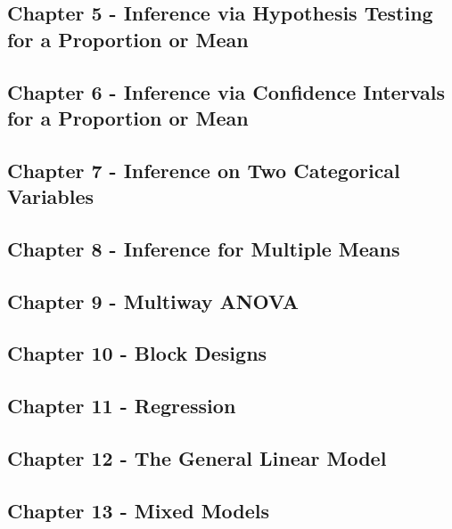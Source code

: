 \documentclass[]{book}
\theoremstyle{definition}
\theoremstyle{definition}
\theoremstyle{definition}
\theoremstyle{remark}
\begin{document}
\subsection{Chapter 5 - Inference via Hypothesis Testing for a
Proportion or
Mean}\label{chapter-5---inference-via-hypothesis-testing-for-a-proportion-or-mean}

\subsection{Chapter 6 - Inference via Confidence Intervals for a
Proportion or
Mean}\label{chapter-6---inference-via-confidence-intervals-for-a-proportion-or-mean}

\subsection{Chapter 7 - Inference on Two Categorical
Variables}\label{chapter-7---inference-on-two-categorical-variables}

\subsection{Chapter 8 - Inference for Multiple
Means}\label{chapter-8---inference-for-multiple-means}

\subsection{Chapter 9 - Multiway
ANOVA}\label{chapter-9---multiway-anova}

\subsection{Chapter 10 - Block
Designs}\label{chapter-10---block-designs}

\subsection{Chapter 11 - Regression}\label{chapter-11---regression}

\subsection{Chapter 12 - The General Linear
Model}\label{chapter-12---the-general-linear-model}

\subsection{Chapter 13 - Mixed Models}\label{chapter-13---mixed-models}
\end{document}
